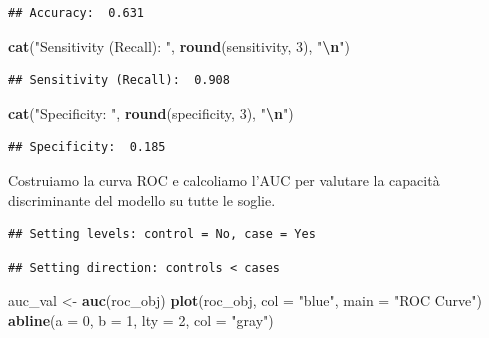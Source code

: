 \documentclass[
]{article}
\newenvironment{Shaded}{\begin{snugshade}}{\end{snugshade}}
\newcommand{\AttributeTok}[1]{\textcolor[rgb]{0.13,0.29,0.53}{#1}}
\newcommand{\DecValTok}[1]{\textcolor[rgb]{0.00,0.00,0.81}{#1}}
\newcommand{\FunctionTok}[1]{\textcolor[rgb]{0.13,0.29,0.53}{\textbf{#1}}}
\newcommand{\NormalTok}[1]{#1}
\newcommand{\OtherTok}[1]{\textcolor[rgb]{0.56,0.35,0.01}{#1}}
\newcommand{\SpecialCharTok}[1]{\textcolor[rgb]{0.81,0.36,0.00}{\textbf{#1}}}
\newcommand{\StringTok}[1]{\textcolor[rgb]{0.31,0.60,0.02}{#1}}
\begin{document}
\begin{verbatim}
## Accuracy:  0.631
\end{verbatim}

\begin{Shaded}
\begin{Highlighting}[]
\FunctionTok{cat}\NormalTok{(}\StringTok{"Sensitivity (Recall): "}\NormalTok{, }\FunctionTok{round}\NormalTok{(sensitivity, }\DecValTok{3}\NormalTok{), }\StringTok{"}\SpecialCharTok{\textbackslash{}n}\StringTok{"}\NormalTok{)}
\end{Highlighting}
\end{Shaded}

\begin{verbatim}
## Sensitivity (Recall):  0.908
\end{verbatim}

\begin{Shaded}
\begin{Highlighting}[]
\FunctionTok{cat}\NormalTok{(}\StringTok{"Specificity: "}\NormalTok{, }\FunctionTok{round}\NormalTok{(specificity, }\DecValTok{3}\NormalTok{), }\StringTok{"}\SpecialCharTok{\textbackslash{}n}\StringTok{"}\NormalTok{)}
\end{Highlighting}
\end{Shaded}

\begin{verbatim}
## Specificity:  0.185
\end{verbatim}

Costruiamo la curva ROC e calcoliamo l'AUC per valutare la capacità
discriminante del modello su tutte le soglie.

\begin{Shaded}
\end{Shaded}

\begin{verbatim}
## Setting levels: control = No, case = Yes
\end{verbatim}

\begin{verbatim}
## Setting direction: controls < cases
\end{verbatim}

\begin{Shaded}
\begin{Highlighting}[]
\NormalTok{auc\_val }\OtherTok{\textless{}{-}} \FunctionTok{auc}\NormalTok{(roc\_obj)}
\FunctionTok{plot}\NormalTok{(roc\_obj, }\AttributeTok{col =} \StringTok{"blue"}\NormalTok{, }\AttributeTok{main =} \StringTok{"ROC Curve"}\NormalTok{)}
\FunctionTok{abline}\NormalTok{(}\AttributeTok{a =} \DecValTok{0}\NormalTok{, }\AttributeTok{b =} \DecValTok{1}\NormalTok{, }\AttributeTok{lty =} \DecValTok{2}\NormalTok{, }\AttributeTok{col =} \StringTok{"gray"}\NormalTok{)}
\end{Highlighting}
\end{Shaded}
\end{document}
